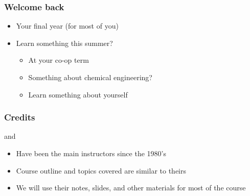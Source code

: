 

\begin{frame}\frametitle{Welcome back}
	\begin{itemize}
		\item	Your final year (for most of you)
		\item	Learn something this summer?
			\begin{itemize}
				\item	At your co-op term
				\item	Something about chemical engineering?
				\item	Learn something about yourself
			\end{itemize}
	\end{itemize}
\end{frame}

\begin{frame}\frametitle{Credits}	
	\begin{exampleblock}{}
		\centering {\color{myOrange}{Dr. Don Woods}} and {\color{myBlue}{Dr. Thomas Marlin}}
	\end{exampleblock}
	\begin{itemize}		
		\item	Have been the main instructors since the 1980's
		\item	Course outline and topics covered are similar to theirs
		\item	We will use their notes, slides, and other materials for most of the course
	\end{itemize}	
\end{frame}

